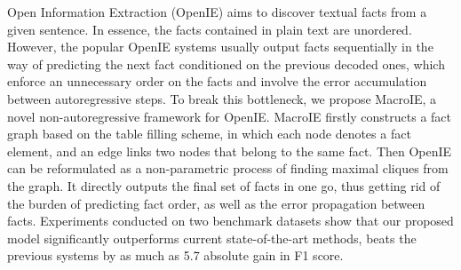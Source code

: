 Open Information Extraction (OpenIE) aims to discover textual facts from a given sentence. In essence, the facts contained in plain text are unordered. However, the popular OpenIE systems usually output facts sequentially in the way of predicting the next fact conditioned on the previous decoded ones, which enforce an unnecessary order on the facts and involve the error accumulation between autoregressive steps. To break this bottleneck, we propose MacroIE, a novel non-autoregressive framework for OpenIE. MacroIE firstly constructs a fact graph based on the table filling scheme, in which each node denotes a fact element, and an edge links two nodes that belong to the same fact. Then OpenIE can be reformulated as a non-parametric process of finding maximal cliques from the graph. It directly outputs the final set of facts in one go, thus getting rid of the burden of predicting fact order, as well as the error propagation between facts. Experiments conducted on two benchmark datasets show that our proposed model significantly outperforms current state-of-the-art methods, beats the previous systems by as much as 5.7 absolute gain in F1 score.
